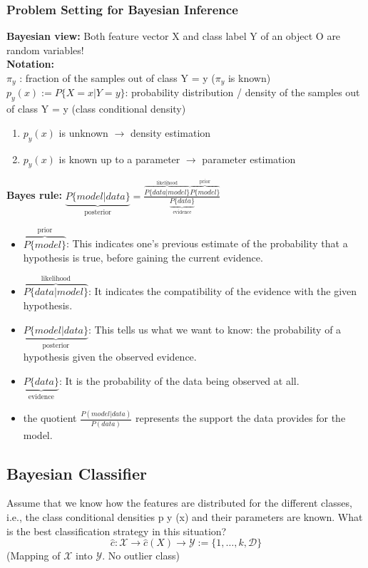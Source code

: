\documentclass[MachineLearning]{subfiles}
\begin{document}
\subsubsection{Problem Setting for Bayesian Inference}
\textbf{Bayesian view:} Both feature vector X and class label Y of an
object O are random variables!\\
\textbf{Notation:}\\
\(\pi_y\) : fraction of the samples out of class Y = y
(\(\pi_y\) is known)\\
\(p_y (x) := P\{X = x|Y = y\}\): probability distribution / density of the samples out of class Y = y (class conditional density)
\begin{enumerate}
\item \(p_y (x)\) is unknown \(\rightarrow\) density estimation
\item \(p_y (x)\) is known up to a parameter \(\rightarrow\) parameter estimation
\end{enumerate}
\textbf{Bayes rule:} \(\underbrace{P\{model|data\}}_{\text{posterior}} = \frac{\overbrace{P\{data|model\}}^{\text{likelihood}}\overbrace{P\{model\}}^{\text{prior}}}{\underbrace{P\{data\}}_{\text{evidence}}}\)
\begin{itemize}
\item \(\overbrace{P\{model\}}^{\text{prior}}\): This indicates one's previous estimate of the probability that a hypothesis is true, before gaining the current evidence.
\item \(\overbrace{P\{data|model\}}^{\text{likelihood}}\): It indicates the compatibility of the evidence with the given hypothesis.
\item \(\underbrace{P\{model|data\}}_{\text{posterior}}\): This tells us what we want to know: the probability of a hypothesis given the observed evidence.
\item \(\underbrace{P\{data\}}_{\text{evidence}}\): It is the probability of the data being observed at all.
\item the quotient \(\frac{P(model|data)}{P(data)}\) represents the support the data provides for the model.
\end{itemize}
\subsection{Bayesian Classifier}
Assume that we know how the features are distributed for the different classes, i.e., the class conditional densities p y (x) and their parameters are known.
What is the best classification strategy in this situation?
\[\hat c: \mathcal{X} \rightarrow \hat c(X) \rightarrow \mathcal{Y} := \{1,\ldots,k,\mathcal{D}\}\] (Mapping of \(\mathcal{X}\) into \(\mathcal{Y}\). No outlier class)\\
\end{document}
